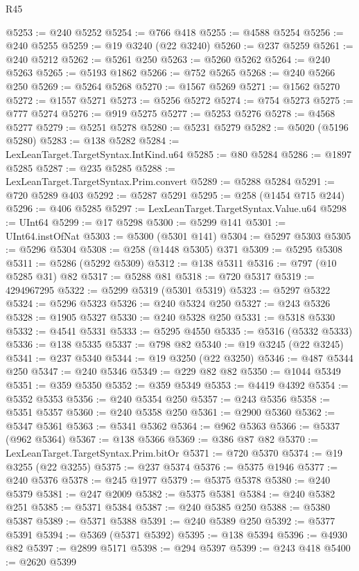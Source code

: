 \begin{lexlean}{R45}
\begin{coremodule}
{@5253 := @240 @5252
@5254 := @766 @418
@5255 := @4588 @5254
@5256 := @240 @5255
@5259 := @19 @3240 (@22 @3240)
@5260 := @237 @5259
@5261 := @240 @5212
@5262 := @5261 @250
@5263 := @5260 @5262
@5264 := @240 @5263
@5265 := @5193 @1862
@5266 := @752 @5265
@5268 := @240 @5266 @250
@5269 := @5264 @5268
@5270 := @1567 @5269
@5271 := @1562 @5270
@5272 := @1557 @5271
@5273 := @5256 @5272
@5274 := @754 @5273
@5275 := @777 @5274
@5276 := @919 @5275
@5277 := @5253 @5276
@5278 := @4568 @5277
@5279 := @5251 @5278
@5280 := @5231 @5279
@5282 := @5020 (@5196 @5280)
@5283 := @138 @5282
@5284 := LexLeanTarget.TargetSyntax.IntKind.u64
@5285 := @80 @5284
@5286 := @1897 @5285
@5287 := @235 @5285
@5288 := LexLeanTarget.TargetSyntax.Prim.convert
@5289 := @5288 @5284
@5291 := @720 @5289 @403
@5292 := @5287 @5291
@5295 := @258 (@1454 @715 @244)
@5296 := @406 @5285
@5297 := LexLeanTarget.TargetSyntax.Value.u64
@5298 := UInt64
@5299 := @17 @5298
@5300 := @5299 @141
@5301 := UInt64.instOfNat
@5303 := @5300 (@5301 @141)
@5304 := @5297 @5303
@5305 := @5296 @5304
@5308 := @258 (@1448 @5305) @371
@5309 := @5295 @5308
@5311 := @5286 (@5292 @5309)
@5312 := @138 @5311
@5316 := @797 (@10 @5285 @31) @82
@5317 := @5288 @81
@5318 := @720 @5317
@5319 := 4294967295
@5322 := @5299 @5319 (@5301 @5319)
@5323 := @5297 @5322
@5324 := @5296 @5323
@5326 := @240 @5324 @250
@5327 := @243 @5326
@5328 := @1905 @5327
@5330 := @240 @5328 @250
@5331 := @5318 @5330
@5332 := @4541 @5331
@5333 := @5295 @4550
@5335 := @5316 (@5332 @5333)
@5336 := @138 @5335
@5337 := @798 @82
@5340 := @19 @3245 (@22 @3245)
@5341 := @237 @5340
@5344 := @19 @3250 (@22 @3250)
@5346 := @487 @5344 @250
@5347 := @240 @5346
@5349 := @229 @82 @82
@5350 := @1044 @5349
@5351 := @359 @5350
@5352 := @359 @5349
@5353 := @4419 @4392
@5354 := @5352 @5353
@5356 := @240 @5354 @250
@5357 := @243 @5356
@5358 := @5351 @5357
@5360 := @240 @5358 @250
@5361 := @2900 @5360
@5362 := @5347 @5361
@5363 := @5341 @5362
@5364 := @962 @5363
@5366 := @5337 (@962 @5364)
@5367 := @138 @5366
@5369 := @386 @87 @82
@5370 := LexLeanTarget.TargetSyntax.Prim.bitOr
@5371 := @720 @5370
@5374 := @19 @3255 (@22 @3255)
@5375 := @237 @5374
@5376 := @5375 @1946
@5377 := @240 @5376
@5378 := @245 @1977
@5379 := @5375 @5378
@5380 := @240 @5379
@5381 := @247 @2009
@5382 := @5375 @5381
@5384 := @240 @5382 @251
@5385 := @5371 @5384
@5387 := @240 @5385 @250
@5388 := @5380 @5387
@5389 := @5371 @5388
@5391 := @240 @5389 @250
@5392 := @5377 @5391
@5394 := @5369 (@5371 @5392)
@5395 := @138 @5394
@5396 := @4930 @82
@5397 := @2899 @5171
@5398 := @294 @5397
@5399 := @243 @418
@5400 := @2620 @5399
}
\end{coremodule}
\end{lexlean}
